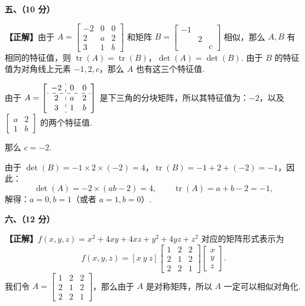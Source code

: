 \documentclass[a4paper,11pt]{ctexart}
\newcommand{\tr}{\operatorname{tr}}
\begin{document}
\vspace{0.8em}

\textbf{五、（10 分）}

\textbf{【正解】}由于 $A = \begin{bmatrix} -2 & 0 & 0 \\ 2 & a & 2 \\ 3 & 1 & b \end{bmatrix}$ 和矩阵 $B = \begin{bmatrix} -1 & & \\ & 2 & \\ & & c \end{bmatrix}$ 相似，那么 $A, B$ 有相同的特征值，则 $\tr(A) = \tr(B)$，$\det(A) = \det(B)$. 由于 $B$ 的特征值为对角线上元素 $-1, 2, c$，那么 $A$ 也有这三个特征值.

由于 $A = \left[\begin{array}{c:cc} -2 & 0 & 0 \\ \hdashline 2 & a & 2 \\ 3 & 1 & b \end{array}\right]$ 是下三角的分块矩阵，所以其特征值为：$-2$，以及 $\begin{bmatrix} a & 2 \\ 1 & b \end{bmatrix}$ 的两个特征值.

那么 $c = -2$.

由于 $\det(B) = -1 \times 2 \times (-2) = 4$，$\tr(B) = -1 + 2 + (-2) = -1$，因此：
\[
  \det(A) = -2 \times (ab - 2) = 4,\qquad \tr(A) = a + b - 2 = -1,
\]
解得：$a = 0, b = 1$（或者 $a = 1, b = 0$）.

\vspace{0.8em}

\textbf{六、（12 分）}

\textbf{【正解】}$f(x, y, z) = x^2 + 4xy + 4xz + y^2 + 4yz + z^2$ 对应的矩阵形式表示为
\[
  f(x, y, z) = [x\ y\ z] \begin{bmatrix} 1 & 2 & 2 \\ 2 & 1 & 2 \\ 2 & 2 & 1 \end{bmatrix} \begin{bmatrix} x \\ y \\ z \end{bmatrix}.
\]
我们令 $A = \begin{bmatrix} 1 & 2 & 2 \\ 2 & 1 & 2 \\ 2 & 2 & 1 \end{bmatrix}$，那么由于 $A$ 是对称矩阵，所以 $A$ 一定可以相似对角化.
\end{document}
